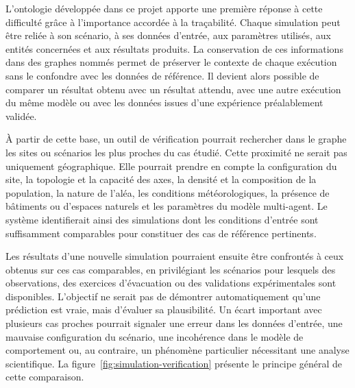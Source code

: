 \documentclass{article}
\begin{document}
L'ontologie développée dans ce projet apporte une première réponse à cette difficulté grâce à l'importance accordée à la traçabilité. Chaque simulation peut être reliée à son scénario, à ses données d'entrée, aux paramètres utilisés, aux entités concernées et aux résultats produits. La conservation de ces informations dans des graphes nommés permet de préserver le contexte de chaque exécution sans le confondre avec les données de référence. Il devient alors possible de comparer un résultat obtenu avec un résultat attendu, avec une autre exécution du même modèle ou avec les données issues d'une expérience préalablement validée.

À partir de cette base, un outil de vérification pourrait rechercher dans le graphe les sites ou scénarios les plus proches du cas étudié. Cette proximité ne serait pas uniquement géographique. Elle pourrait prendre en compte la configuration du site, la topologie et la capacité des axes, la densité et la composition de la population, la nature de l'aléa, les conditions météorologiques, la présence de bâtiments ou d'espaces naturels et les paramètres du modèle multi-agent. Le système identifierait ainsi des simulations dont les conditions d'entrée sont suffisamment comparables pour constituer des cas de référence pertinents.

Les résultats d'une nouvelle simulation pourraient ensuite être confrontés à ceux obtenus sur ces cas comparables, en privilégiant les scénarios pour lesquels des observations, des exercices d'évacuation ou des validations expérimentales sont disponibles. L'objectif ne serait pas de démontrer automatiquement qu'une prédiction est vraie, mais d'évaluer sa plausibilité. Un écart important avec plusieurs cas proches pourrait signaler une erreur dans les données d'entrée, une mauvaise configuration du scénario, une incohérence dans le modèle de comportement ou, au contraire, un phénomène particulier nécessitant une analyse scientifique. La figure~\ref{fig:simulation-verification} présente le principe général de cette comparaison.
\end{document}
